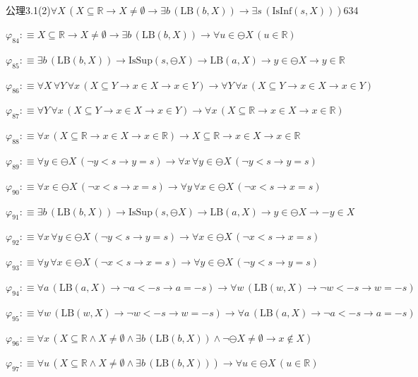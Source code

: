\begin{fullproof}{公理3.1(2)}{$\forall X\,(X \subseteq \mathbb{R} \to X \neq \emptyset \to \exists b\,(\mathrm{LB}(b,X)) \to \exists s\,(\mathrm{IsInf}(s,X)))$}{634}
\begin{abbrevlist}
\item $\varphi_{84} :\equiv X \subseteq \mathbb{R} \to X \neq \emptyset \to \exists b\,(\mathrm{LB}(b,X)) \to \forall u \in \ominus X\,(u \in \mathbb{R})$
\item $\varphi_{85} :\equiv \exists b\,(\mathrm{LB}(b,X)) \to \mathrm{IsSup}(s,\ominus X) \to \mathrm{LB}(a,X) \to y \in \ominus X \to y \in \mathbb{R}$
\item $\varphi_{86} :\equiv \forall X\,\forall Y\,\forall x\,(X \subseteq Y \to x \in X \to x \in Y) \to \forall Y\,\forall x\,(X \subseteq Y \to x \in X \to x \in Y)$
\item $\varphi_{87} :\equiv \forall Y\,\forall x\,(X \subseteq Y \to x \in X \to x \in Y) \to \forall x\,(X \subseteq \mathbb{R} \to x \in X \to x \in \mathbb{R})$
\item $\varphi_{88} :\equiv \forall x\,(X \subseteq \mathbb{R} \to x \in X \to x \in \mathbb{R}) \to X \subseteq \mathbb{R} \to x \in X \to x \in \mathbb{R}$
\item $\varphi_{89} :\equiv \forall y \in \ominus X\,(\neg y < s \to y = s) \to \forall x\,\forall y \in \ominus X\,(\neg y < s \to y = s)$
\item $\varphi_{90} :\equiv \forall x \in \ominus X\,(\neg x < s \to x = s) \to \forall y\,\forall x \in \ominus X\,(\neg x < s \to x = s)$
\item $\varphi_{91} :\equiv \exists b\,(\mathrm{LB}(b,X)) \to \mathrm{IsSup}(s,\ominus X) \to \mathrm{LB}(a,X) \to y \in \ominus X \to -y \in X$
\item $\varphi_{92} :\equiv \forall x\,\forall y \in \ominus X\,(\neg y < s \to y = s) \to \forall x \in \ominus X\,(\neg x < s \to x = s)$
\item $\varphi_{93} :\equiv \forall y\,\forall x \in \ominus X\,(\neg x < s \to x = s) \to \forall y \in \ominus X\,(\neg y < s \to y = s)$
\item $\varphi_{94} :\equiv \forall a\,(\mathrm{LB}(a,X) \to \neg a < -s \to a = -s) \to \forall w\,(\mathrm{LB}(w,X) \to \neg w < -s \to w = -s)$
\item $\varphi_{95} :\equiv \forall w\,(\mathrm{LB}(w,X) \to \neg w < -s \to w = -s) \to \forall a\,(\mathrm{LB}(a,X) \to \neg a < -s \to a = -s)$
\item $\varphi_{96} :\equiv \forall x\,(X \subseteq \mathbb{R} \land X \neq \emptyset \land \exists b\,(\mathrm{LB}(b,X)) \land \neg \ominus X \neq \emptyset \to x \notin X)$
\item $\varphi_{97} :\equiv \forall u\,(X \subseteq \mathbb{R} \land X \neq \emptyset \land \exists b\,(\mathrm{LB}(b,X))) \to \forall u \in \ominus X\,(u \in \mathbb{R})$

\end{abbrevlist}
\end{fullproof}
